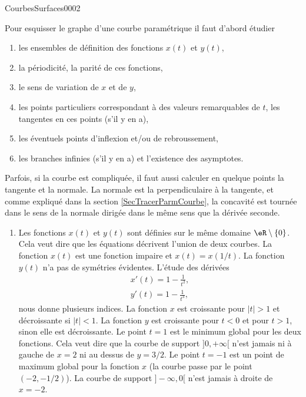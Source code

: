 \begin{corrige}{CourbesSurfaces0002}

Pour esquisser  le graphe d'une courbe paramétrique il faut d'abord étudier 
\let\OldTheenumi\theenumi
\renewcommand{\theenumi}{\roman{enumi}}
\begin{enumerate}
	\item les ensembles de définition des fonctions $x(t)$ et $y(t)$, 

        \item la périodicité, la parité de ces fonctions, 

        \item le sens de variation de $x$ et de $y$, 

        \item les points particuliers correspondant à des valeurs remarquables de $t$, les tangentes en ces points (s'il y en a), 

        \item les éventuels points d'inflexion et/ou de rebroussement, 

        \item les branches infinies (s'il y en a) et l'existence des asymptotes.
		
\end{enumerate}
\let\theenumi\OldTheenumi

Parfois, si la courbe est compliquée,  il faut aussi calculer en quelque points la tangente et la normale. La normale est la perpendiculaire à la tangente, et comme expliqué dans la section \ref{SecTracerParmCourbe}, la concavité est tournée dans le sens de la normale dirigée dans le même sens que la dérivée seconde.

  \begin{enumerate}
      \item \label{Itemzzdexoi}
      Les fonctions $x(t)$ et $y(t)$ sont définies sur le même domaine $\eR\setminus\{0\}$. Cela veut dire que les équations décrivent l'union de deux courbes. La fonction $x(t)$ est une fonction impaire et $x(t)=x(1/t)$. La fonction $y(t)$ n'a pas de symétries évidentes. L'étude des dérivées 
    \begin{equation}
      \begin{aligned}
        x'(t)= 1-\frac{1}{t^2},\\
        y'(t)= 1-\frac{1}{t^3},
      \end{aligned}
    \end{equation}
nous donne plusieurs indices. La fonction $x$ est croissante pour $|t|>1$ et décroissante si $|t|<1$. La fonction $y$ est croissante pour $t<0$ et pour $t>1$, sinon elle est décroissante. Le point $t=1$ est le minimum global pour les deux fonctions. Cela veut dire que la courbe de support $]0, +\infty[$ n'est jamais ni à gauche de  $x=2$ ni au dessus de $y=3/2$. Le point $t=-1$ est un point de maximum global pour la fonction $x$ (la courbe passe par le point $(-2, -1/2)$). La courbe de support $]-\infty, 0[$ n'est jamais à droite de $x=-2$.  


\end{enumerate}
\end{corrige}
